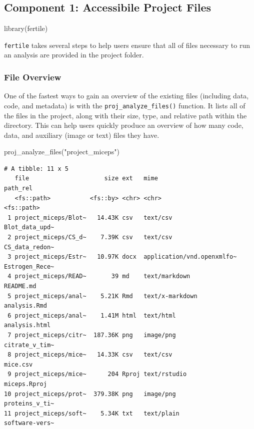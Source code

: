 \documentclass[12pt,twoside]{reedthesis}
\newenvironment{Shaded}{\begin{snugshade}}{\end{snugshade}}
\newcommand{\FunctionTok}[1]{\textcolor[rgb]{0.00,0.00,0.00}{#1}}
\newcommand{\NormalTok}[1]{#1}
\newcommand{\StringTok}[1]{\textcolor[rgb]{0.31,0.60,0.02}{#1}}
\begin{document}
\hypertarget{component-1-accessibile-project-files}{%
\subsection{Component 1: Accessibile Project Files}\label{component-1-accessibile-project-files}}
\begin{Shaded}
\begin{Highlighting}[]
\FunctionTok{library}\NormalTok{(fertile)}
\end{Highlighting}
\end{Shaded}
\texttt{fertile} takes several steps to help users ensure that all of files necessary to run an analysis are provided in the project folder.

\hypertarget{file-overview}{%
\subsubsection{File Overview}\label{file-overview}}

One of the fastest ways to gain an overview of the existing files (including data, code, and metadata) is with the \texttt{proj\_analyze\_files()} function. It lists all of the files in the project, along with their size, type, and relative path within the directory. This can help users quickly produce an overview of how many code, data, and auxiliary (image or text) files they have.
\begin{Shaded}
\begin{Highlighting}[]
\FunctionTok{proj\_analyze\_files}\NormalTok{(}\StringTok{"project\_miceps"}\NormalTok{)}
\end{Highlighting}
\end{Shaded}
\footnotesize
\begin{verbatim}
# A tibble: 11 x 5
   file                     size ext   mime                       path_rel      
   <fs::path>           <fs::by> <chr> <chr>                      <fs::path>    
 1 project_miceps/Blot~   14.43K csv   text/csv                   Blot_data_upd~
 2 project_miceps/CS_d~    7.39K csv   text/csv                   CS_data_redon~
 3 project_miceps/Estr~   10.97K docx  application/vnd.openxmlfo~ Estrogen_Rece~
 4 project_miceps/READ~       39 md    text/markdown              README.md     
 5 project_miceps/anal~    5.21K Rmd   text/x-markdown            analysis.Rmd  
 6 project_miceps/anal~    1.41M html  text/html                  analysis.html 
 7 project_miceps/citr~  187.36K png   image/png                  citrate_v_tim~
 8 project_miceps/mice~   14.33K csv   text/csv                   mice.csv      
 9 project_miceps/mice~      204 Rproj text/rstudio               miceps.Rproj  
10 project_miceps/prot~  379.38K png   image/png                  proteins_v_ti~
11 project_miceps/soft~    5.34K txt   text/plain                 software-vers~
\end{verbatim}
\normalsize
\end{document}
